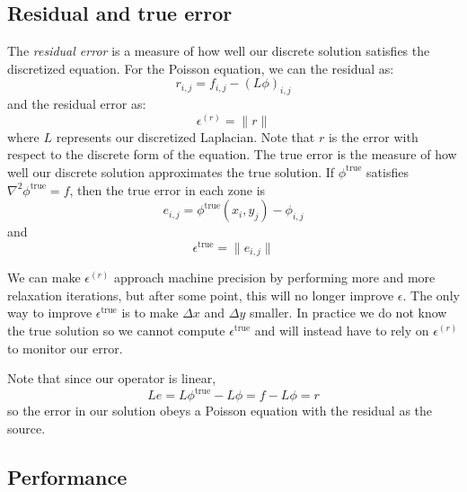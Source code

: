 \subsection{Residual and true error}

The {\em residual error} is a measure of how well our discrete solution
satisfies the discretized equation.  For the Poisson equation, we
can the residual as:
\begin{equation}
r_{i,j} = f_{i,j} - (L \phi)_{i,j} 
\end{equation}
and the residual error as:
\begin{equation}
\epsilon^{(r)} = \| r \|
\end{equation}
where $L$ represents our discretized Laplacian.  Note that $r$ is the
error with respect to the discrete form of the equation.  The true
error is the measure of how well our discrete solution approximates
the true solution.  If $\phi^\mathrm{true}$ satisfies $\nabla^2
\phi^\mathrm{true} = f$, then the true error in each zone is
\begin{equation}
e_{i,j} = \phi^\mathrm{true}(x_i,y_j) - \phi_{i,j} 
\end{equation}
and
\begin{equation}
\epsilon^\mathrm{true} = \| e_{i,j} \|
\end{equation}

We can make $\epsilon^{(r)}$ approach machine precision by performing
more and more relaxation iterations, but after some point, this will
no longer improve $\epsilon$.  The only way to improve
$\epsilon^\mathrm{true}$ is to make $\Delta x$ and $\Delta y$ smaller.
In practice we do not know the true solution so we cannot compute
$\epsilon^\mathrm{true}$ and will instead have to rely on
$\epsilon^{(r)}$ to monitor our error.

Note that since our operator is linear,
\begin{equation}
L e = L\phi^\mathrm{true} - L\phi = f - L\phi = r
\end{equation}
so the error in our solution obeys a Poisson equation with the residual
as the source.

\subsection{Performance}


